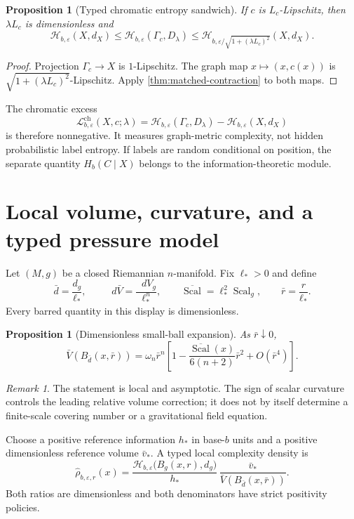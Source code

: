 \documentclass[11pt,a4paper]{article}
\theoremstyle{definition}
\theoremstyle{plain}
\newtheorem{proposition}[definition]{Proposition}
\theoremstyle{remark}
\newtheorem{remark}[definition]{Remark}
\newcommand{\Hmet}{\mathscr{H}}
\newcommand{\dd}{\mathop{}\!d}
\newcommand{\Scal}{\operatorname{Scal}}
\begin{document}
\begin{proposition}[Typed chromatic entropy sandwich]
\label{prop:chromatic}
If $c$ is $L_c$-Lipschitz, then $\lambda L_c$ is dimensionless and
\[
\Hmet_{b,\varepsilon}(X,d_X)
\leq
\Hmet_{b,\varepsilon}(\Gamma_c,D_\lambda)
\leq
\Hmet_{b,\varepsilon/\sqrt{1+(\lambda L_c)^2}}(X,d_X).
\]
\end{proposition}

\begin{proof}
Projection $\Gamma_c\to X$ is $1$-Lipschitz. The graph map
$x\mapsto(x,c(x))$ is
$\sqrt{1+(\lambda L_c)^2}$-Lipschitz. Apply
\cref{thm:matched-contraction} to both maps.
\end{proof}

The chromatic excess
\[
\mathscr{L}^{\mathrm{ch}}_{b,\varepsilon}(X,c;\lambda)
=
\Hmet_{b,\varepsilon}(\Gamma_c,D_\lambda)
-
\Hmet_{b,\varepsilon}(X,d_X)
\]
is therefore nonnegative. It measures graph-metric complexity, not hidden
probabilistic label entropy. If labels are random conditional on position,
the separate quantity $H_b(C\mid X)$ belongs to the information-theoretic
module.

\section{Local volume, curvature, and a typed pressure model}

Let $(M,g)$ be a closed Riemannian $n$-manifold. Fix $\ell_*>0$ and define
\[
\bar d=\frac{d_g}{\ell_*},
\qquad
\dd\bar V=\frac{\dd V_g}{\ell_*^n},
\qquad
\overline{\Scal}=\ell_*^2\Scal_g,
\qquad
\bar r=\frac{r}{\ell_*}.
\]
Every barred quantity in this display is dimensionless.

\begin{proposition}[Dimensionless small-ball expansion]
\label{prop:small-ball}
As $\bar r\downarrow0$,
\[
\bar V(B_{\bar d}(x,\bar r))
=
\omega_n\bar r^n
\left[
1-\frac{\overline{\Scal}(x)}{6(n+2)}\bar r^2
+O(\bar r^4)
\right].
\]
\end{proposition}

\begin{remark}
The statement is local and asymptotic. The sign of scalar curvature
controls the leading relative volume correction; it does not by itself
determine a finite-scale covering number or a gravitational field equation.
\end{remark}

Choose a positive reference information $h_*$ in base-$b$ units and a
positive dimensionless reference volume $\bar v_*$. A typed local
complexity density is
\[
\widehat\rho_{b,\varepsilon,r}(x)
=
\frac{
\Hmet_{b,\varepsilon}
\bigl(B_g(x,r),d_g\bigr)
}{h_*}
\,
\frac{\bar v_*}
{\bar V(B_{\bar d}(x,\bar r))}.
\]
Both ratios are dimensionless and both denominators have strict positivity
policies.
\end{document}
